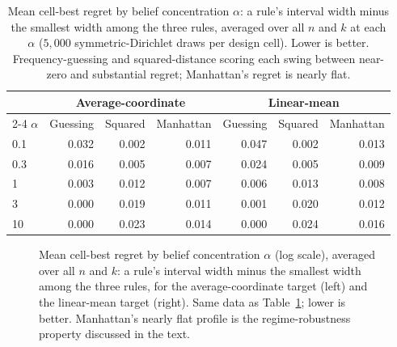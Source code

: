 \begin{table}[h]
\centering
\small
\begin{tabular}{lrrrrrr}
\hline
& \multicolumn{3}{c}{Average-coordinate} & \multicolumn{3}{c}{Linear-mean}\\
\cline{2-4}\cline{5-7}
\(\alpha\) & Guessing & Squared & Manhattan & Guessing & Squared & Manhattan\\
\hline
0.1 & 0.032 & 0.002 & 0.011 & 0.047 & 0.002 & 0.013\\
0.3 & 0.016 & 0.005 & 0.007 & 0.024 & 0.005 & 0.009\\
1   & 0.003 & 0.012 & 0.007 & 0.006 & 0.013 & 0.008\\
3   & 0.000 & 0.019 & 0.011 & 0.001 & 0.020 & 0.012\\
10  & 0.000 & 0.023 & 0.014 & 0.000 & 0.024 & 0.016\\
\hline
\end{tabular}
\caption{Mean cell-best regret by belief concentration \(\alpha\): a rule's interval width minus the smallest width among the three rules, averaged over all \(n\) and \(k\) at each \(\alpha\) (\(5{,}000\) symmetric-Dirichlet draws per design cell). Lower is better. Frequency-guessing and squared-distance scoring each swing between near-zero and substantial regret; Manhattan's regret is nearly flat.}
\label{tab:regime-regret}
\end{table}

\begin{figure}[h]
\centering

\caption{Mean cell-best regret by belief concentration \(\alpha\) (log scale), averaged over all \(n\) and \(k\): a rule's interval width minus the smallest width among the three rules, for the average-coordinate target (left) and the linear-mean target (right). Same data as Table~\ref{tab:regime-regret}; lower is better. Manhattan's nearly flat profile is the regime-robustness property discussed in the text.}
\label{fig:regime-regret}
\end{figure}

